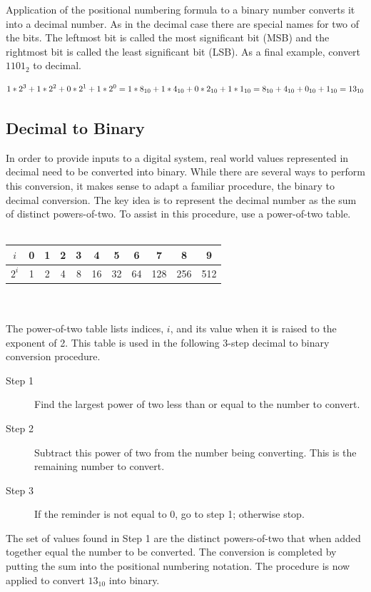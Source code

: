 Application of the positional numbering formula to a binary number
converts it into a decimal number.  As in the decimal case 
there are special names for two of the bits. The leftmost bit is 
called the most significant bit (MSB) and the 
rightmost bit is called the least significant 
bit (LSB).  As a final example, convert $1101_2$ to decimal.

$$1*2^3 + 1*2^2 + 0*2^1 + 1*2^0 = \\
1*8_{10} + 1*4_{10} + 0*2_{10} + 1*1_{10} = \\
8_{10} + 4_{10} + 0_{10} + 1_{10} = 13_{10}$$
\label{page:bin2dec}


\subsection{Decimal to Binary}
In order to provide inputs to a digital system, real world values
represented in decimal need to be converted into binary.
While there are several ways to perform
this conversion, it makes sense to adapt a familiar procedure, 
the binary to decimal conversion.  The key idea is to represent the 
decimal number as the sum of distinct powers-of-two.  To assist in this
procedure, use a power-of-two table.
\\ \\
\begin{tabular}{|c|c|c|c|c|c|c|c|c|c|c|}\hline
$i$   & 0 & 1 &  2 &  3 &  4 &  5 &  6 &  7  &  8  &  9  \\ \hline
$2^i$ & 1 & 2 &  4 &  8 & 16 & 32 & 64 & 128 & 256 &  512\\ \hline 
\end{tabular}
\\ \\
The power-of-two table lists indices, $i$, and its value when it is
raised to the exponent of 2.  This table is used in the following
3-step decimal to binary conversion procedure.

\begin{description}
\item [Step 1] Find the largest power of two less than or equal to the 
number to convert.  
\item [Step 2] Subtract this power of two from the number being converting.
This is the remaining number to convert.
\item [Step 3] If the reminder is not equal to 0, go to step 1; otherwise stop.
\end{description}

The set of values found in Step 1 are the distinct powers-of-two that
when added together equal the number to be converted.  The conversion
is completed by putting the sum into the positional numbering notation.  
The procedure is now applied to convert $13_{10}$ into binary.

